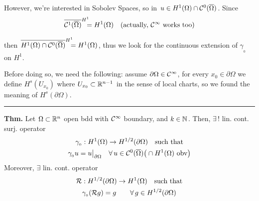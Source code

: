 \smallskip

However, we're interested in Sobolev Spaces, so in $u\in H^1(\Omega)\cap \mathcal{C}^0(\overline{\Omega})$. Since
\begin{equation*}
\overline{\mathcal{C}^1(\overline{\Omega})}^{H^1}\!\!\!\!=H^1(\Omega) \quad(\text{actually, }\mathcal{C}^\infty\text{ works too})
\end{equation*}

then $\overline{H^1(\Omega)\cap\mathcal{C}^0(\overline{\Omega})}^{H^1}\!\!\!\!=H^1(\Omega)$, thus we look for the continuous extension of $\gamma_{_0}$ on $H^1$. 

\begin{Figure}
\end{Figure}

Before doing so, we need the following: assume $\partial\Omega\in\mathcal{C}^\infty$, for every $x_0\in\partial\Omega$ we define $H^s(U_{x_0})$ where $U_{x_0}\subset\mathbb{R}^{n-1}$ in the sense of local charts, so we found the meaning of $H^s(\partial\Omega)$.

\rule{0.31\textwidth}{0.2pt}
\smallskip

\textbf{Thm.} Let $\Omega\subset\mathbb{R}^n$ open bdd with $\mathcal{C}^\infty$ boundary, and $k\in\mathbb{N}$. Then, $\exists\,!$ lin. cont. surj. operator 
\begin{gather*}
\gamma_{_0}:H^1(\Omega)\to H^{1/2}(\partial\Omega)\quad\text{such that} \\
\gamma_{_0} u=u\big|_{\partial\Omega}\quad\forall\, u\in\mathcal{C}^0(\overline{\Omega})\big(\cap H^1(\Omega)\text{ obv}\big)
\end{gather*}
Moreover, $\exists$ lin. cont. operator 
\begin{gather*}
\mathcal{R}:H^{1/2}(\partial\Omega)\to H^1(\Omega)\quad\text{such that} \\
\gamma_{_0}(\mathcal{R} g)=g\qquad\forall\, g\in H^{1/2}(\partial\Omega)
\end{gather*}

